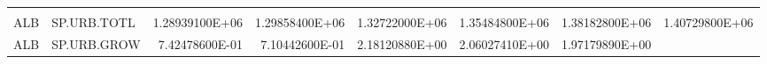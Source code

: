 \documentclass[]{article}
\begin{document}
\begin{longtable}[]{@{}llrrrrrr@{}}
\begin{minipage}[t]{0.11\columnwidth}
\end{minipage}\tabularnewline
\begin{minipage}[t]{0.06\columnwidth}\raggedright\strut
ALB\strut
\end{minipage} & \begin{minipage}[t]{0.08\columnwidth}\raggedright\strut
SP.URB.TOTL\strut
\end{minipage} & \begin{minipage}[t]{0.11\columnwidth}\raggedleft\strut
1.28939100E+06\strut
\end{minipage} & \begin{minipage}[t]{0.11\columnwidth}\raggedleft\strut
1.29858400E+06\strut
\end{minipage} & \begin{minipage}[t]{0.11\columnwidth}\raggedleft\strut
1.32722000E+06\strut
\end{minipage} & \begin{minipage}[t]{0.11\columnwidth}\raggedleft\strut
1.35484800E+06\strut
\end{minipage} & \begin{minipage}[t]{0.11\columnwidth}\raggedleft\strut
1.38182800E+06\strut
\end{minipage} & \begin{minipage}[t]{0.11\columnwidth}\raggedleft\strut
1.40729800E+06\strut
\end{minipage}\tabularnewline
\begin{minipage}[t]{0.06\columnwidth}\raggedright\strut
ALB\strut
\end{minipage} & \begin{minipage}[t]{0.08\columnwidth}\raggedright\strut
SP.URB.GROW\strut
\end{minipage} & \begin{minipage}[t]{0.11\columnwidth}\raggedleft\strut
7.42478600E-01\strut
\end{minipage} & \begin{minipage}[t]{0.11\columnwidth}\raggedleft\strut
7.10442600E-01\strut
\end{minipage} & \begin{minipage}[t]{0.11\columnwidth}\raggedleft\strut
2.18120880E+00\strut
\end{minipage} & \begin{minipage}[t]{0.11\columnwidth}\raggedleft\strut
2.06027410E+00\strut
\end{minipage} & \begin{minipage}[t]{0.11\columnwidth}\raggedleft\strut
1.97179890E+00\strut
\end{minipage} & \begin{minipage}[t]{0.11\columnwidth}\raggedleft\strut

\end{minipage}
\end{longtable}
\end{document}
